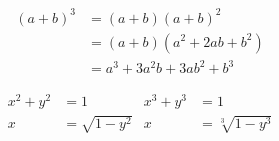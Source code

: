 \begin{align}
  (a + b)^3 &= (a + b)(a+b)^2           \\
            &= (a + b)(a^2 + 2ab + b^2) \\ 
            &= a^3 + 3a^2b + 3ab^2 + b^3
\end{align}

\begin{align}
  x^2 + y^2 &=1                &
  x^3 + y^3 &=1                \\
  x         &= \sqrt   {1-y^2} &
  x         &= \sqrt[3]{1-y^3} \\
\end{align}
